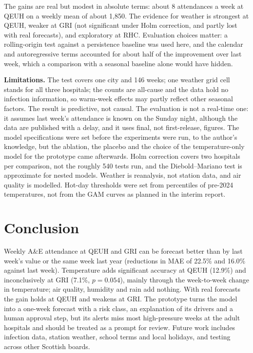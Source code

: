 The gains are real but modest in absolute terms: about 8 attendances a week at QEUH on a weekly mean of about 1,850. The evidence for weather is strongest at QEUH, weaker at GRI (not significant under Holm correction, and partly lost with real forecasts), and exploratory at RHC. Evaluation choices matter: a rolling-origin test against a persistence baseline \parencite{garciacrespi2026} was used here, and the calendar and autoregressive terms accounted for about half of the improvement over last week, which a comparison with a seasonal baseline alone would have hidden.

\textbf{Limitations.} The test covers one city and 146 weeks; one weather grid cell stands for all three hospitals; the counts are all-cause and the data hold no infection information, so warm-week effects may partly reflect other seasonal factors. The result is predictive, not causal. The evaluation is not a real-time one: it assumes last week's attendance is known on the Sunday night, although the data are published with a delay, and it uses final, not first-release, figures. The model specifications were set before the experiments were run, to the author's knowledge, but the ablation, the placebo and the choice of the temperature-only model for the prototype came afterwards. Holm correction covers two hospitals per comparison, not the roughly 540 tests run, and the Diebold--Mariano test is approximate for nested models. Weather is reanalysis, not station data, and air quality is modelled. Hot-day thresholds were set from percentiles of pre-2024 temperatures, not from the GAM curves as planned in the interim report.

\section{Conclusion}
Weekly A\&E attendance at QEUH and GRI can be forecast better than by last week's value or the same week last year (reductions in MAE of 22.5\% and 16.0\% against last week). Temperature adds significant accuracy at QEUH (12.9\%) and inconclusively at GRI (7.1\%, $p=0.054$), mainly through the week-to-week change in temperature; air quality, humidity and rain add nothing. With real forecasts the gain holds at QEUH and weakens at GRI. The prototype turns the model into a one-week forecast with a risk class, an explanation of its drivers and a human approval step, but its alerts miss most high-pressure weeks at the adult hospitals and should be treated as a prompt for review. Future work includes infection data, station weather, school terms and local holidays, and testing across other Scottish boards.
